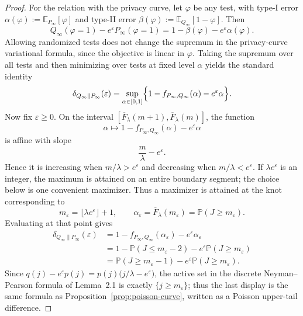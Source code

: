 \documentclass{article}
\begin{document}
\begin{proof}
For the relation with the privacy curve, let $\varphi$ be any test, with type-I error
$\alpha(\varphi):=\mathbb E_{P_\infty}[\varphi]$ and type-II error
$\beta(\varphi):=\mathbb E_{Q_\infty}[1-\varphi]$. Then
\[
Q_\infty(\varphi=1)-e^\varepsilon P_\infty(\varphi=1)
=1-\beta(\varphi)-e^\varepsilon\alpha(\varphi).
\]
Allowing randomized tests does not change the supremum in the privacy-curve variational formula, since the objective is linear in $\varphi$. Taking the supremum over all tests and then minimizing over tests at fixed level $\alpha$ yields the standard identity
\[
\delta_{Q_\infty\|P_\infty}(\varepsilon)
=\sup_{\alpha\in[0,1]}\Bigl\{1-f_{P_\infty,Q_\infty}(\alpha)-e^\varepsilon\alpha\Bigr\}.
\]
Now fix $\varepsilon\ge 0$. On the interval
$[\overline F_\lambda(m+1),\overline F_\lambda(m)]$, the function
\[
\alpha\longmapsto 1-f_{P_\infty,Q_\infty}(\alpha)-e^\varepsilon\alpha
\]
is affine with slope
\[
\frac{m}{\lambda}-e^\varepsilon.
\]
Hence it is increasing when $m/\lambda>e^\varepsilon$ and decreasing when $m/\lambda<e^\varepsilon$. If $\lambda e^\varepsilon$ is an integer, the maximum is attained on an entire boundary segment; the choice below is one convenient maximizer. Thus a maximizer is attained at the knot corresponding to
\[
m_\varepsilon=\lfloor \lambda e^\varepsilon\rfloor+1,
\qquad
\alpha_\varepsilon=\overline F_\lambda(m_\varepsilon)=\mathbb P(J\ge m_\varepsilon).
\]
Evaluating at that point gives
\begin{align*}
\delta_{Q_\infty\|P_\infty}(\varepsilon)
&=1-f_{P_\infty,Q_\infty}(\alpha_\varepsilon)-e^\varepsilon\alpha_\varepsilon\\
&=1-\mathbb P(J\le m_\varepsilon-2)-e^\varepsilon\mathbb P(J\ge m_\varepsilon)\\
&=\mathbb P(J\ge m_\varepsilon-1)-e^\varepsilon\mathbb P(J\ge m_\varepsilon).
\end{align*}
Since $q(j)-e^\varepsilon p(j)=p(j)\bigl(j/\lambda-e^\varepsilon\bigr)$, the active set in the discrete
Neyman--Pearson formula of Lemma~2.1 is exactly $\{j\ge m_\varepsilon\}$; thus the last display is the
same formula as Proposition~\ref{prop:poisson-curve}, written as a Poisson upper-tail difference.
\end{proof}
\end{document}
